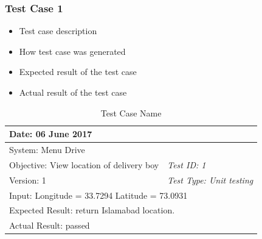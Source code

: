 \subsubsection{Test Case 1}

\begin{itemize}
    \item Test case description
    \item How test case was generated
    \item Expected result of the test case
    \item Actual result of the test case
\end{itemize}

\begin{table}[H]
    \centering
    \caption{Test Case Name}
    \label{tab:test_case_1}
    \begin{tabular}{|p{7cm}|p{7cm}|}
        \hline
        Date: 06 June 2017 & \\ \hline
        System: Menu Drive & \\ \hline
        Objective: View location of delivery boy & \textit{Test ID: 1} \\ \hline
        Version: 1 & \textit{Test Type: Unit testing} \\ \hline
        \multicolumn{2}{|p{14cm}|}{Input: \newline Longitude = 33.7294 \newline Latitude = 73.0931} \\ \hline
        \multicolumn{2}{|p{14cm}|}{Expected Result: return Islamabad location.} \\ \hline
        \multicolumn{2}{|p{14cm}|}{Actual Result: passed} \\ \hline
    \end{tabular}
\end{table}





\setcounter{chapter}{5}           
